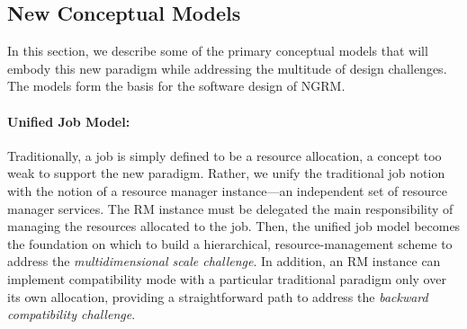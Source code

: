 \documentclass[10pt]{article}
\newcommand{\ngrm}{NGRM}
\begin{document}
\subsection{New Conceptual Models}
\label{sect:models}
In this section, we describe some of the primary conceptual models that will embody 
this new paradigm while addressing the multitude of design challenges. 
The models form the basis for the software design of \ngrm.


\paragraph{Unified Job Model:}
Traditionally, a job is simply defined to be a resource allocation, 
a concept too weak to support the new paradigm. 
Rather, we unify the traditional job notion 
with the notion of a resource manager instance---an independent set of resource manager services.
The RM instance must be delegated the main responsibility of managing the resources allocated to the job.
Then, the unified job model becomes the foundation
on which to build a hierarchical, resource-management 
scheme to address the {\sl multidimensional scale challenge}.
In addition, an RM instance can implement compatibility mode with a particular 
traditional paradigm only over its own allocation, providing a straightforward path to address
the {\sl backward compatibility challenge}. 
\end{document}
